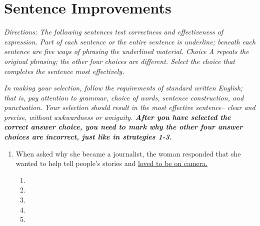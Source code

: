 \section{Sentence Improvements}

\textit{Directions: The following sentences test correctness and effectiveness of expression. Part of each sentence or the entire sentence is underline; beneath each sentence are five ways of phrasing the underlined material. Choice A repeats the original phrasing; the other four choices are different. Select the choice that completes the sentence most effectively. }

\textit{In making your selection, follow the requirements of standard written English; that is, pay attention to grammar, choice of words, sentence construction, and punctuation. Your selection should result in the most effective sentence-- clear and precise, without awkwardness or amiguity. \textbf{After you have selected the correct answer choice, you need to mark why the other four answer choices are incorrect, just like in strategies 1-3.}}

\begin{enumerate}
\item When asked why she became a journalist, the woman responded that she wanted to help tell people’s stories and \ul{ loved to be on camera.}

\bigskip
\begin{enumerate}[label=(\Alph*)]
\item    \hrulefill
\item    \hrulefill
\item   \hrulefill
\item   \hrulefill
\item   \hrulefill
\end{enumerate}

\end{enumerate}

